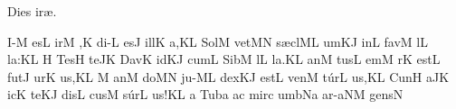 
\beginhymn Dies ir\ae .

\Internote
{}
\nosolesmescustos
\initiumgregorianum
{}%
\sgn {}I-\punctum M\egn
\sgn {}es\punctum L\egn
\spatium
\sgn {}ir\punctum M\egn
\sgn {}{\ae},\punctum K\egn
\spatium
\sgn di-\punctum L\egn
\sgn {}es\engl{}\punctum J\egn
\spatium
\sgn {}i{ll}\punctum K\egn
\sgn {}a,\punctum K\augmentum L\egn
\spatium
\divisiominor
\spatium
\sgn Sol\punctum M\egn
\sgn vet\pes MN\egn
\spatium
\sgn s{\ae}{cl}\clivis ML\egn
\sgn {}um\clivis KJ\egn
\spatium
\sgn {}in\punctum L\egn
\spatium
\sgn fav\punctum M\egn
\sgn {}{\'\i}l\punctum L\egn
\sgn la:\punctum K\augmentum L\egn
\spatium
\divisiominor
\spatium
\custos H
\Internote
\lineaproxima
\sgn Tes\punctum H\egn
\sgn te{}\pes JK\egn
\spatium
\sgn Dav\punctum K\egn
\sgn {}id\clivis KJ\egn
\spatium
\sgn cum\punctum L\egn
\spatium
\sgn Sib\punctum M\egn
{}l\punctum L\egn
\sgn la.\punctum K\augmentum L\egn
\spatium
\divisiofinalis
\spatium
{}an\punctum M\egn
\sgn tus\punctum L\egn
\spatium
{}em\punctum M\egn
{}r\punctum K\egn
\spatium
\sgn {}e{st}\punctum L\egn
\spatium
\sgn fut\punctum J\egn
\sgn {}u{r}\punctum K\egn
\sgn {}u{s,}\punctum K\augmentum L\egn
\spatium
\divisiominor
\spatium
\custos M
\lineaproxima
{}an\punctum M\egn
\sgn do{}\pes MN\egn
\spatium
\sgn ju-\clivis ML\egn
\sgn dex\clivis KJ\egn
\spatium
\sgn {}e{st}\punctum L\egn
\spatium
\sgn ven\punctum M\egn
\sgn t{\'u}r\punctum L\egn
\sgn {}u{s,}\punctum K\augmentum L\egn
\spatium
\divisiominor
\spatium
\sgn Cun\punctum H\egn
{}a{}\pes JK\egn
\spatium
{}ic\punctum K\egn
\sgn te{}\clivis KJ\egn
\spatium
\sgn dis\punctum L\egn
\sgn cus\punctum M\egn
\sgn s{\'u}r\punctum L\egn
\sgn {}u{s!}\punctum K\augmentum L\egn
\spatium
\divisiofinalis
\spatium
\custos a
\Internote
\lineaproxima
\sgn T{u}b\punctum a\egn
\sgn {}a{}\punctum c\egn
\spatium
\sgn mir\punctum c\egn
\sgn {}um\porrectus bNa\egn
\spatium
{}a{r-}\climacus aNM\egn
\sgn ge{ns}\punctum N\egn
